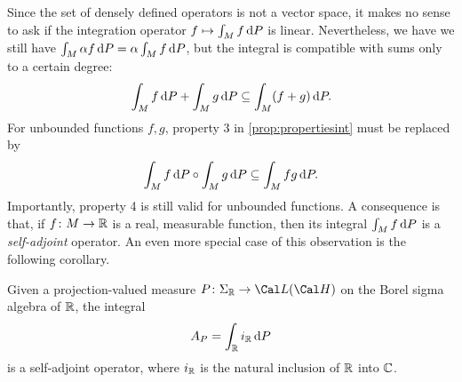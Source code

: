 Since the set of densely defined operators is
not a vector space, it makes no sense to ask if the integration
operator \(f\mapsto \int_Mf\mathop{}\!\mathrm{d} P\) is linear.
Nevertheless, we have we still have
\(\int_{M}^{}\alpha f\mathop{}\!\mathrm{d} P = \alpha \int_{M}^{}f\mathop{}\!\mathrm{d} P\), but the
integral is compatible with sums only to a certain degree:
\begin{equation}
  \int_{M}f\mathop{}\!\mathrm{d} P
  +
  \int_{M}g\mathop{}\!\mathrm{d} P
  \subseteq 
  \int_{M}(f+g)\mathop{}\!\mathrm{d} P
.\end{equation}
For unbounded functions \(f,g\), property 3 in
\cref{prop:propertiesint} must be replaced by
\begin{equation}
  \int_{M}f\mathop{}\!\mathrm{d} P
  \circ
  \int_{M}g\mathop{}\!\mathrm{d} P
  \subseteq 
  \int_{M}fg\mathop{}\!\mathrm{d} P
.\end{equation}
Importantly, property 4 is still valid for unbounded functions.
A consequence is that, if \(f\colon M\to\mathbb{R}\) is a real,
measurable function, then its integral \(\int_Mf\mathop{}\!\mathrm{d} P\) is a
\emph{self-adjoint} operator.
An even more special case of this observation is the following
corollary.
\begin{corollary}
  \label{cor:inverse-spectral-theorem}
  Given a projection-valued measure \(P\colon\Sigma_\R\to\Cal L(\Cal H)\)
  on the Borel sigma algebra of \(\mathbb{R}\), the integral
  \begin{equation}
    A_P = \int_{\mathbb{R}}i_{\mathbb{R}}\mathop{}\!\mathrm{d} P
  \end{equation}
  is a self-adjoint operator, where \(i_{\mathbb{R}}\) is the natural inclusion
  of \(\mathbb{R}\) into \(\mathbb{C}\).
\end{corollary}



